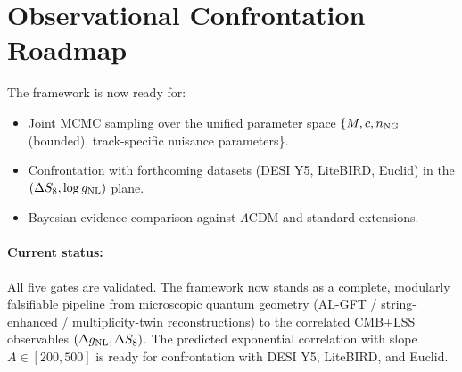 \documentclass[12pt]{article}
\begin{document}
\section{Observational Confrontation Roadmap}
The framework is now ready for:
\begin{itemize}
    \item Joint MCMC sampling over the unified parameter space \(\{M, c, n_{\rm NG}\) (bounded), track-specific nuisance parameters\}.
    \item Confrontation with forthcoming datasets (DESI Y5, LiteBIRD, Euclid) in the \((\Delta S_8, \log g_{\rm NL})\) plane.
    \item Bayesian evidence comparison against \(\Lambda\)CDM and standard extensions.
\end{itemize}

\paragraph{Current status:}
All five gates are validated. The framework now stands as a complete, modularly falsifiable pipeline from microscopic quantum geometry (AL-GFT / string-enhanced / multiplicity-twin reconstructions) to the correlated CMB+LSS observables \((\Delta g_{\rm NL}, \Delta S_8)\). The predicted exponential correlation with slope \(A \in [200,500]\) is ready for confrontation with DESI Y5, LiteBIRD, and Euclid.

\nocite{*}


\clearpage
\end{document}
